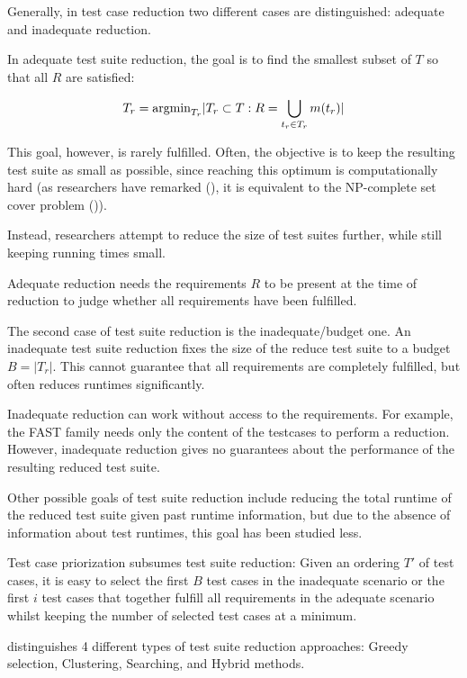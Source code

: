 Generally, in test case reduction two different cases are distinguished:
adequate and inadequate reduction.

In adequate test suite reduction, the goal is to find the smallest subset
of $T$ so that all $R$ are satisfied:

$$T_{r}=\hbox{argmin}_{T_{r}} |T_{r} \subset T: R=\bigcup_{t_{r} \in T_{r}} m(t_{r})|$$

This goal, however, is rarely fulfilled. Often, the objective is to
keep the resulting test suite as small as possible, since reaching
this optimum is computationally hard (as researchers have remarked
(\cite{khan2016survey}), it is equivalent to the NP-complete set cover
problem (\cite{garey1979computers})).

Instead, researchers attempt to reduce the size of test suites further,
while still keeping running times small.

Adequate reduction needs the requirements $R$ to be present at the time
of reduction to judge whether all requirements have been fulfilled.

The second case of test suite reduction is the inadequate/budget one. An
inadequate test suite reduction fixes the size of the reduce test suite
to a budget $B=|T_{r}|$. This cannot guarantee that all requirements
are completely fulfilled, but often reduces runtimes significantly.

Inadequate reduction can work without access to the requirements.
For example, the FAST family needs only the content of the testcases to
perform a reduction. However, inadequate reduction gives no guarantees
about the performance of the resulting reduced test suite.

Other possible goals of test suite reduction include reducing the total
runtime of the reduced test suite given past runtime information, but
due to the absence of information about test runtimes, this goal has
been studied less. %

Test case priorization subsumes test suite reduction: Given an ordering
$T'$ of test cases, it is easy to select the first $B$ test cases in the
inadequate scenario or the first $i$ test cases that together fulfill
all requirements in the adequate scenario whilst keeping the number of
selected test cases at a minimum.

\cite{khan2018systematic} distinguishes 4 different types of test
suite reduction approaches: Greedy selection, Clustering, Searching,
and Hybrid methods.

